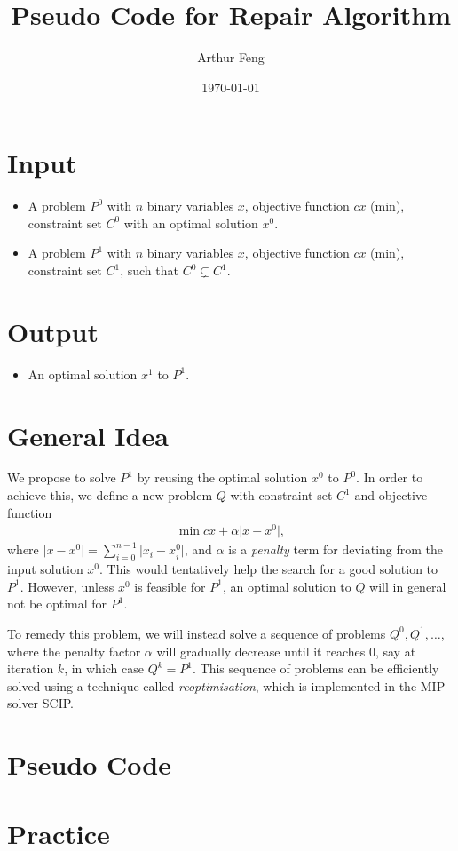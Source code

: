 \documentclass[11pt]{article}
\title{Pseudo Code for Repair Algorithm}
\author{Arthur Feng}
\date{\today}
\begin{document}
\maketitle

\section{Input}
\begin{itemize}
    \item A problem $P^0$ with $n$ binary variables $x$, objective function $c x$ (min), constraint set $C^0$ with an optimal solution $x^0$.
    \item A problem $P^1$ with $n$ binary variables $x$, objective function $c x$ (min), constraint set $C^1$, such that $C^0 \subsetneq C^1$.
\end{itemize}							

\section{Output}
\begin{itemize}	
    \item An optimal solution $x^1$ to $P^1$.
\end{itemize}

\section{General Idea}
We propose to solve $P^1$ by reusing the optimal solution $x^0$ to $P^0$.
In order to achieve this, we define a new problem $Q$ with constraint set $C^1$ and objective function
\begin{align*}
    \min c x + \alpha \lvert x - x^0 \rvert,					
\end{align*}
where $\lvert x - x^0 \rvert = \sum_{i=0}^{n-1}\lvert x_i - x^0_i \rvert$, and $\alpha$ is a \emph{penalty} term for deviating from the input solution $x^0$.
This would tentatively help the search for a good solution to $P^1$.
However, unless $x^0$ is feasible for $P^1$, an optimal solution to $Q$ will in general not be optimal for $P^1$.

To remedy this problem, we will instead solve a sequence of problems $Q^0, Q^1, \dots$, where the penalty factor $\alpha$ will gradually decrease until it reaches 0, say at iteration $k$, in which case $Q^k = P^1$.
This sequence of problems can be efficiently solved using a technique called \emph{reoptimisation}, which is implemented in the MIP solver SCIP.

\section{Pseudo Code}


\section{Practice}
\end{document}
